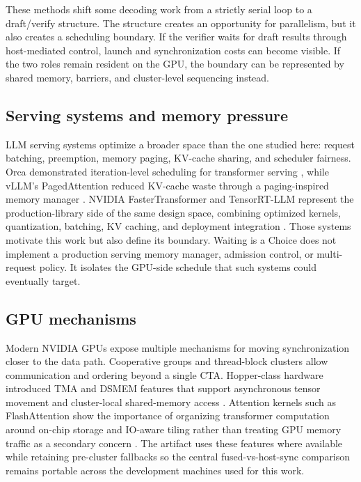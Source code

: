 \documentclass[11pt]{article}
\begin{document}
These methods shift some decoding work from a strictly serial loop to a draft/verify structure. The structure creates an opportunity for parallelism, but it also creates a scheduling boundary. If the verifier waits for draft results through host-mediated control, launch and synchronization costs can become visible. If the two roles remain resident on the GPU, the boundary can be represented by shared memory, barriers, and cluster-level sequencing instead.

\subsection{Serving systems and memory pressure}
LLM serving systems optimize a broader space than the one studied here: request batching, preemption, memory paging, KV-cache sharing, and scheduler fairness. Orca demonstrated iteration-level scheduling for transformer serving \cite{yu2022orca}, while vLLM's PagedAttention reduced KV-cache waste through a paging-inspired memory manager \cite{kwon2023pagedattention}. NVIDIA FasterTransformer and TensorRT-LLM represent the production-library side of the same design space, combining optimized kernels, quantization, batching, KV caching, and deployment integration \cite{nvidiaFasterTransformer,nvidiaTensorRTLLM}. Those systems motivate this work but also define its boundary. Waiting is a Choice does not implement a production serving memory manager, admission control, or multi-request policy. It isolates the GPU-side schedule that such systems could eventually target.

\subsection{GPU mechanisms}
Modern NVIDIA GPUs expose multiple mechanisms for moving synchronization closer to the data path. Cooperative groups and thread-block clusters allow communication and ordering beyond a single CTA. Hopper-class hardware introduced TMA and DSMEM features that support asynchronous tensor movement and cluster-local shared-memory access \cite{nvidiaHopperGuide,nvidiaCudaGuide}. Attention kernels such as FlashAttention show the importance of organizing transformer computation around on-chip storage and IO-aware tiling rather than treating GPU memory traffic as a secondary concern \cite{dao2022flashattention}. The artifact uses these features where available while retaining pre-cluster fallbacks so the central fused-vs-host-sync comparison remains portable across the development machines used for this work.
\end{document}
